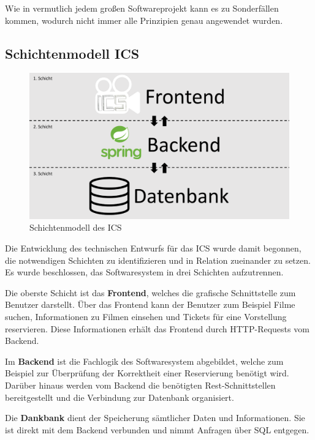 		Wie in vermutlich jedem großen Softwareprojekt kann es zu Sonderfällen kommen, wodurch nicht immer alle Prinzipien genau angewendet wurden. 
		
		\subsection{Schichtenmodell ICS}\label{schichtenmodell}
		
		
		\begin{figure}[H]
			\centering 
			\includegraphics[width=12cm]{img/Schichtenmodell_ICS.pdf}
			\captionsetup{format=hang}
			\caption[Schichtenmodell des ICS]{\label{fig:Schichtenmodell} Schichtenmodell des \ac{ICS} }
		\end{figure}
		
		Die Entwicklung des technischen Entwurfs für das \ac{ICS} wurde damit begonnen, die notwendigen Schichten zu identifizieren und in Relation zueinander zu setzen. Es wurde beschlossen, das Softwaresystem in drei Schichten aufzutrennen. 
		
		Die oberste Schicht ist das \glqq \textbf{Frontend}\grqq{}, welches die grafische Schnittstelle zum Benutzer darstellt. Über das Frontend kann der Benutzer zum Beispiel Filme suchen, Informationen zu Filmen einsehen und Tickets für eine Vorstellung reservieren. Diese Informationen erhält das Frontend durch HTTP-Requests vom Backend.
		
		Im \glqq \textbf{Backend}\grqq{} ist die Fachlogik des Softwaresystem abgebildet, welche zum Beispiel zur Überprüfung der Korrektheit einer Reservierung benötigt wird. Darüber hinaus werden vom Backend die benötigten Rest-Schnittstellen bereitgestellt und die Verbindung zur Datenbank organisiert. 
		
		Die \textbf{Dankbank} dient der Speicherung sämtlicher Daten und Informationen. Sie ist direkt mit dem Backend verbunden und nimmt Anfragen über SQL entgegen. 
		
